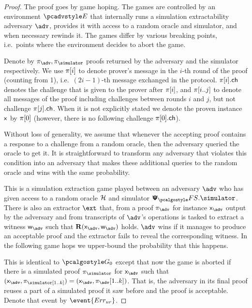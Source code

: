 \documentclass[runningheads,11pt]{llncs}
\begin{document}
\begin{proof}		
  The proof goes by game hoping. The games are controlled by an environment
  $\env$ that internally runs a simulation extractability adversary $\advse$,
  provides it with access to a random oracle and simulator, and when necessary
  rewinds it. The games differ by various breaking points, i.e.~points where the
  environment decides to abort the game.

  Denote by $\zkproof_{\advse}, \zkproof_{\simulator}$ proofs returned by the
  adversary and the simulator respectively. We use $\pi[i]$ to denote
  prover's message in the $i$-th round of the proof (counting from 1), i.e.~$(2i
  - 1)$-th message exchanged in the protocol. $\pi[i].\mathsf{ch}$ denotes the
  challenge that is given to the prover after $\pi[i]$, and
  $\pi[i..j]$ to denote all messages of the proof including challenges
  between rounds $i$ and $j$, but not challenge $\pi[j].\mathsf{ch}$. When it is
  not explicitly stated we denote the proven instance $\mathsf{x}$ by $\pi[0]$
  (however, there is no following challenge $\pi[0].\mathsf{ch}$).

  Without loss of generality, we assume that whenever the accepting proof
  contains a response to a challenge from a random oracle, then the
  adversary queried the oracle to get it. It is straightforward to transform any
  adversary that violates this condition into an adversary that makes these
  additional queries to the random oracle and wins with the same probability.

   This is a simulation extraction game played between an adversary
  $\advse$ who has given access to a random oracle $\mathcal{H}$ and simulator
  $\psfs.\simulator$. There is also an extractor $\ext$ that, from a proof
  $\zkproof_{\advse}$ for instance $\inp_{\advse}$ output by the adversary and from
   transcripts of $\advse$'s operations is tasked to extract a witness
  $\wit_{\advse}$ such that $\REL(\inp_{\advse}, \wit_{\advse})$ holds. $\advse$ wins
  if it manages to produce an acceptable proof and the extractor fails to reveal
  the corresponding witness. In the following game hops we upper-bound the
  probability that this happens.

   This is identical to $\game{0}$ except that now the game is aborted
  if there is a simulated proof $\zkproof_\simulator$ for $\inp_{\advse}$ such
  that $(\inp_{\advse}, \zkproof_\simulator[1..k]) = (\inp_{\advse},
  \zkproof_{\advse}[1..k])$. That is, the adversary in its final proof
  reuses a part of a simulated proof it saw before and the proof is acceptable.
  Denote that event by $\event{\errur}$.


\end{proof}
\end{document}
